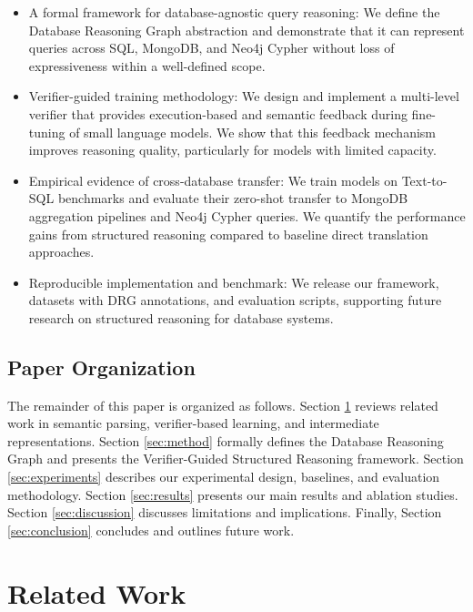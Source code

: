\documentclass[conference]{IEEEtran}
\begin{document}
\begin{itemize}
\item A formal framework for database-agnostic query reasoning: We define the Database Reasoning Graph abstraction and demonstrate that it can represent queries across SQL, MongoDB, and Neo4j Cypher without loss of expressiveness within a well-defined scope.

\item Verifier-guided training methodology: We design and implement a multi-level verifier that provides execution-based and semantic feedback during fine-tuning of small language models. We show that this feedback mechanism improves reasoning quality, particularly for models with limited capacity.

\item Empirical evidence of cross-database transfer: We train models on Text-to-SQL benchmarks and evaluate their zero-shot transfer to MongoDB aggregation pipelines and Neo4j Cypher queries. We quantify the performance gains from structured reasoning compared to baseline direct translation approaches.

\item Reproducible implementation and benchmark: We release our framework, datasets with DRG annotations, and evaluation scripts, supporting future research on structured reasoning for database systems.
\end{itemize}

\subsection{Paper Organization}

The remainder of this paper is organized as follows. Section \ref{sec:related} reviews related work in semantic parsing, verifier-based learning, and intermediate representations. Section \ref{sec:method} formally defines the Database Reasoning Graph and presents the Verifier-Guided Structured Reasoning framework. Section \ref{sec:experiments} describes our experimental design, baselines, and evaluation methodology. Section \ref{sec:results} presents our main results and ablation studies. Section \ref{sec:discussion} discusses limitations and implications. Finally, Section \ref{sec:conclusion} concludes and outlines future work.

\section{Related Work}
\label{sec:related}
\end{document}
